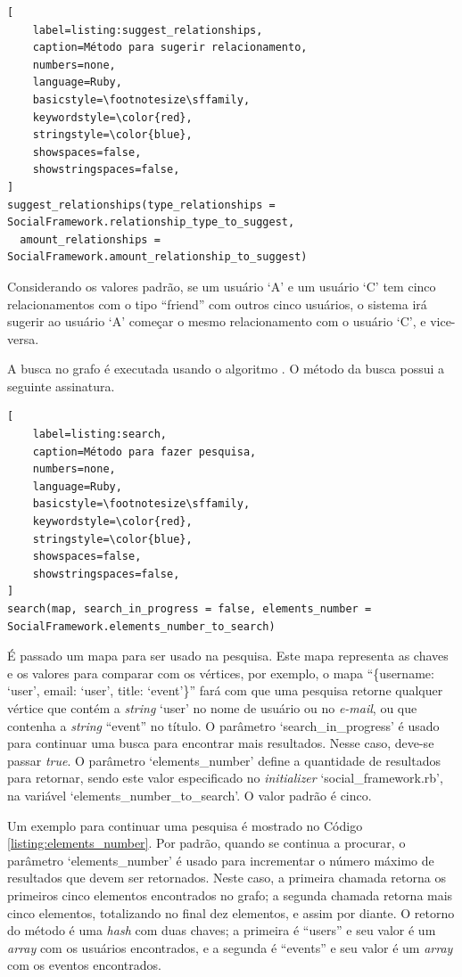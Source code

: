 \begin{lstlisting}[
    label=listing:suggest_relationships,
    caption=Método para sugerir relacionamento,
    numbers=none,
    language=Ruby,
    basicstyle=\footnotesize\sffamily,
    keywordstyle=\color{red},
    stringstyle=\color{blue},
    showspaces=false,
    showstringspaces=false,
]
suggest_relationships(type_relationships = SocialFramework.relationship_type_to_suggest,
  amount_relationships = SocialFramework.amount_relationship_to_suggest)
\end{lstlisting}

Considerando os valores padrão, se um usuário `A' e um usuário `C' tem cinco relacionamentos com o tipo  ``friend'' com outros cinco usuários, o sistema irá sugerir ao usuário `A' começar o mesmo relacionamento com o usuário `C', e vice-versa.

A busca no grafo é executada usando o algoritmo . O método da busca possui a seguinte assinatura.

\begin{lstlisting}[
    label=listing:search,
    caption=Método para fazer pesquisa,
    numbers=none,
    language=Ruby,
    basicstyle=\footnotesize\sffamily,
    keywordstyle=\color{red},
    stringstyle=\color{blue},
    showspaces=false,
    showstringspaces=false,
]
search(map, search_in_progress = false, elements_number = SocialFramework.elements_number_to_search)
\end{lstlisting}

É passado um mapa para ser usado na pesquisa. Este mapa representa as chaves e os valores para comparar com os vértices, por exemplo, o mapa ``\{username: `user', email: `user', title: `event'\}'' fará com que uma pesquisa retorne qualquer vértice que contém a \textit{string} `user' no nome de usuário ou no \textit{e-mail}, ou que contenha a \textit{string} ``event'' no título. O parâmetro `search\_in\_progress' é usado para continuar uma busca para encontrar mais resultados. Nesse caso, deve-se passar \textit{true}. O parâmetro `elements\_number' define a quantidade de resultados para retornar, sendo este valor especificado no \textit{initializer} `social\_framework.rb', na variável `elements\_number\_to\_search'. O valor padrão é cinco.

Um exemplo para continuar uma pesquisa é mostrado no Código \ref{listing:elements_number}. Por padrão, quando se continua a procurar, o parâmetro `elements\_number' é usado para incrementar o número máximo de resultados que devem ser retornados. Neste caso, a primeira chamada retorna os primeiros cinco elementos encontrados no grafo; a segunda chamada retorna mais cinco elementos, totalizando no final dez elementos, e assim por diante. O retorno do método é uma \textit{hash} com duas chaves; a primeira é ``users'' e seu valor é um \textit{array} com os usuários encontrados, e a segunda é ``events'' e seu valor é um \textit{array} com os eventos encontrados.

